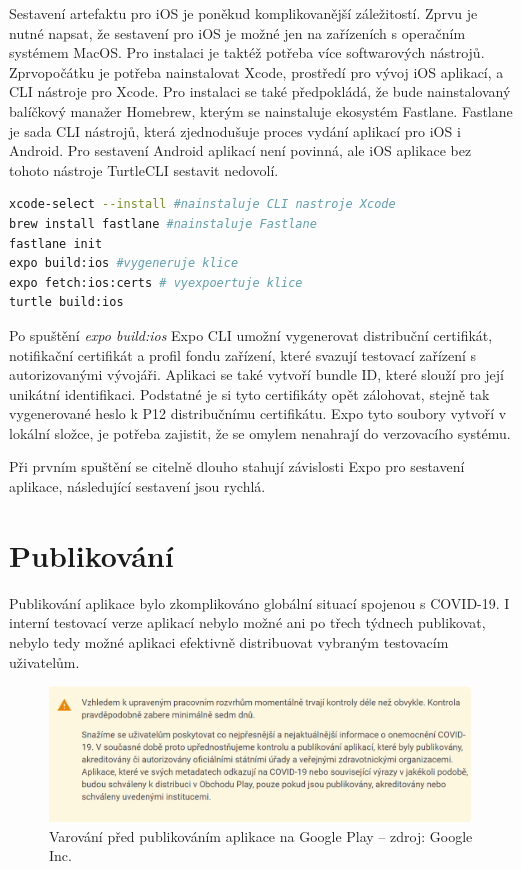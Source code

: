 Sestavení artefaktu pro iOS je poněkud komplikovanější záležitostí. Zprvu je nutné napsat, že sestavení pro iOS je možné jen na zařízeních s operačním systémem MacOS. Pro instalaci je taktéž potřeba více softwarových nástrojů. Zprvopočátku je potřeba nainstalovat Xcode, prostředí pro vývoj iOS aplikací, a CLI nástroje pro Xcode. Pro instalaci se také předpokládá, že bude nainstalovaný balíčkový manažer Homebrew, kterým se nainstaluje ekosystém Fastlane. Fastlane je sada CLI nástrojů, která zjednodušuje proces vydání aplikací pro iOS i Android. Pro sestavení Android aplikací není povinná, ale iOS aplikace bez tohoto nástroje TurtleCLI sestavit nedovolí.

\begin{lstlisting}[language=Bash, caption=Sestavení na Android]
xcode-select --install #nainstaluje CLI nastroje Xcode 
brew install fastlane #nainstaluje Fastlane
fastlane init
expo build:ios #vygeneruje klice
expo fetch:ios:certs # vyexpoertuje klice 
turtle build:ios
\end{lstlisting}

Po spuštění \emph{expo build:ios} Expo CLI umožní vygenerovat distribuční certifikát, notifikační certifikát a profil fondu zařízení, které svazují testovací zařízení s autorizovanými vývojáři. Aplikaci se také vytvoří bundle ID, které slouží pro její unikátní identifikaci. Podstatné je si tyto certifikáty opět zálohovat, stejně tak vygenerované heslo k P12 distribučnímu certifikátu. Expo tyto soubory vytvoří v lokální složce, je potřeba zajistit, že se omylem nenahrají do verzovacího systému.

Při prvním spuštění se citelně dlouho stahují závislosti Expo pro sestavení aplikace, následující sestavení jsou rychlá.

\section{Publikování}

Publikování aplikace bylo zkomplikováno globální situací spojenou s COVID-19. I interní testovací verze aplikací nebylo možné ani po třech týdnech publikovat, nebylo tedy možné aplikaci efektivně distribuovat vybraným testovacím uživatelům.

\begin{figure}[H]
	\begin{center}
		\includegraphics[width=140mm]{img/covid19.png}
	\end{center}
	\caption[Varování před publikováním aplikace na Google Play]{Varování před publikováním aplikace na Google Play -- zdroj: Google Inc.}
\end{figure}

